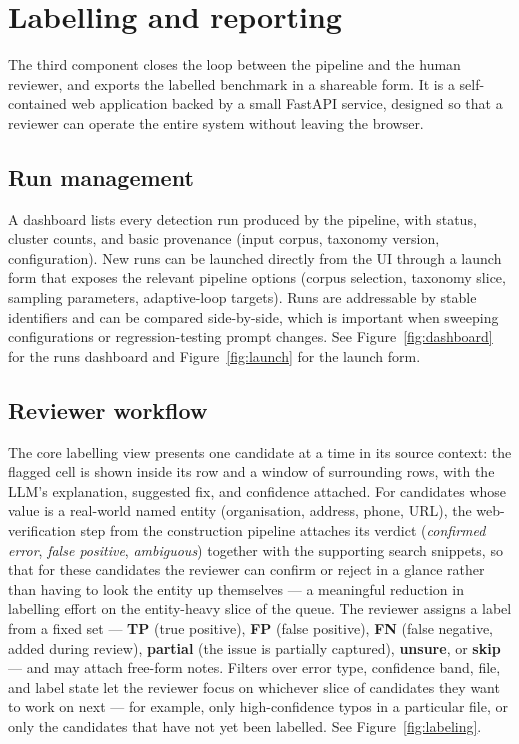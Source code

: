\documentclass[11pt]{article}
\begin{document}
\section*{Labelling and reporting}
The third component closes the loop between the pipeline and
the human reviewer, and exports the labelled benchmark in a
shareable form. It is a self-contained web application backed
by a small FastAPI service, designed so that a reviewer can
operate the entire system without leaving the browser.

\subsection*{Run management}
A dashboard lists every detection run produced by the
pipeline, with status, cluster counts, and basic provenance
(input corpus, taxonomy version, configuration). New runs
can be launched directly from the UI through a launch form
that exposes the relevant pipeline options (corpus selection,
taxonomy slice, sampling parameters, adaptive-loop targets).
Runs are addressable by stable identifiers and can be compared
side-by-side, which is important when sweeping configurations
or regression-testing prompt changes. See
Figure~\ref{fig:dashboard} for the runs dashboard and
Figure~\ref{fig:launch} for the launch form.

\subsection*{Reviewer workflow}
The core labelling view presents one candidate at a time in
its source context: the flagged cell is shown inside its row
and a window of surrounding rows, with the LLM's explanation,
suggested fix, and confidence attached. For candidates whose
value is a real-world named entity (organisation, address,
phone, URL), the web-verification step from the construction
pipeline attaches its verdict (\emph{confirmed error},
\emph{false positive}, \emph{ambiguous}) together with the
supporting search snippets, so that for these candidates the
reviewer can confirm or reject in a glance rather than having
to look the entity up themselves --- a meaningful reduction
in labelling effort on the entity-heavy slice of the queue.
The reviewer assigns a label from a fixed set ---
\textbf{TP} (true positive), \textbf{FP} (false positive),
\textbf{FN} (false negative, added during review),
\textbf{partial} (the issue is partially captured),
\textbf{unsure}, or \textbf{skip} --- and may attach
free-form notes. Filters over error type, confidence band,
file, and label state let the reviewer focus on whichever
slice of candidates they want to work on next --- for
example, only high-confidence typos in a particular file,
or only the candidates that have not yet been labelled. See
Figure~\ref{fig:labeling}.
\end{document}
